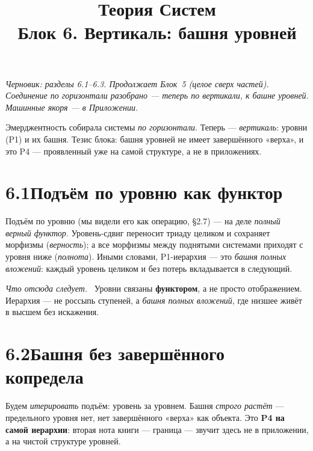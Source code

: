 \documentclass[12pt,a4paper]{article}
\title{\textbf{Теория Систем}\\[2mm]\large Блок 6. Вертикаль: башня уровней}
\author{}
\date{}
\newcommand{\rezultat}{\medskip\noindent\emph{Что отсюда следует.}\ }
\begin{document}
\maketitle
\thispagestyle{empty}

\noindent\small\textit{Черновик: разделы 6.1--6.3. Продолжает Блок~5 (целое сверх частей).
Соединение по горизонтали разобрано --- теперь по \emph{вертикали}, к башне уровней. Машинные
якоря --- в Приложении.}\normalsize

\bigskip

\noindent Эмерджентность собирала системы \emph{по горизонтали}. Теперь --- \emph{вертикаль}: уровни
(P1) и их башня. Тезис блока: башня уровней не имеет завершённого «верха», и это P4 --- проявленный
уже на самой структуре, а не в приложениях.

\section*{6.1\quad Подъём по уровню как функтор}

Подъём по уровню (мы видели его как операцию, §2.7) --- на деле \emph{полный верный функтор}.
Уровень-сдвиг переносит триаду целиком и сохраняет морфизмы (\emph{верность}); а все морфизмы между
поднятыми системами приходят с уровня ниже (\emph{полнота}). Иными словами, P1-иерархия --- это
\emph{башня полных вложений}: каждый уровень целиком и без потерь вкладывается в следующий.

\rezultat
Уровни связаны \textbf{функтором}, а не просто отображением. Иерархия --- не россыпь ступеней, а
\emph{башня полных вложений}, где низшее живёт в высшем без искажения.

\section*{6.2\quad Башня без завершённого копредела}

Будем \emph{итерировать} подъём: уровень за уровнем. Башня \emph{строго растёт} --- предельного уровня
нет, нет завершённого «верха» как объекта. Это \textbf{P4 на самой иерархии}: вторая нота книги ---
граница --- звучит здесь не в приложении, а на чистой структуре уровней.
\end{document}
